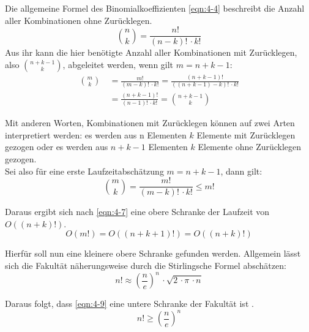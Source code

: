 Die allgemeine Formel des Binomialkoeffizienten \eqref{eqn:4-4} beschreibt die Anzahl aller Kombinationen ohne Zurücklegen. 
\begin{equation} \label{eqn:4-4}
\tag{4-4}
\binom{n}{k} = \frac{n!}{(n-k)!\, \cdotp k!}
\end{equation} 
Aus ihr kann die hier benötigte Anzahl aller Kombinationen mit Zurücklegen, also  $ \binom{n + k - 1}{k} $, abgeleitet werden, wenn gilt $ m = n + k - 1 $:
\begin{equation} \label{eqn:4-5}
\tag{4-5}
\begin{aligned}
\binom{m}{k} &\ {} = \frac{m!}{(m - k)!\, \cdotp k!} 
= \frac{(n+k-1)!}{((n+k-1)-k)!\, \cdotp k!} \\
&\ = \frac{(n+k-1)!}{(n-1)!\, \cdotp k!} 
= \binom{n + k - 1}{k}
\end{aligned}
\end{equation}

Mit anderen Worten, Kombinationen mit Zurücklegen können auf zwei Arten interpretiert werden: es werden aus n Elementen $ k $ Elemente mit Zurücklegen gezogen oder es werden aus $ n + k - 1 $ Elementen $ k $ Elemente ohne Zurücklegen gezogen. \\

Sei also für eine erste Laufzeitabschätzung $ m = n + k - 1 $, dann gilt:
\begin{equation} \label{eqn:4-6}
\tag{4-6}
\binom{m}{k} = \frac{m!}{(m - k)!\, \cdotp k!} \leq m!
\end{equation} 

Daraus ergibt sich nach \eqref{eqn:4-7} eine obere Schranke der Laufzeit von \linebreak $ O((n + k)!) $. 
\begin{equation} \label{eqn:4-7}
\tag{4-7}
O(m!) = O((n + k + 1)!) = O((n + k)!)
\end{equation} 

Hierfür soll nun eine kleinere obere Schranke gefunden werden. Allgemein lässt sich die Fakultät näherungsweise durch die Stirlingsche Formel \cite{bronst} abschätzen:
\begin{equation} \label{eqn:4-8}
\tag{4-8}
n! \approx \left( \frac{n}{e} \right) ^n \, \cdotp \sqrt{2 \, \cdotp \pi \, \cdotp n}
\end{equation} 

Daraus folgt, dass \eqref{eqn:4-9} eine untere Schranke der Fakultät ist \cite{script_binom}.
\begin{equation} \label{eqn:4-9}
\tag{4-9}
n! \geq \left( \frac{n}{e} \right) ^n 
\end{equation} 

